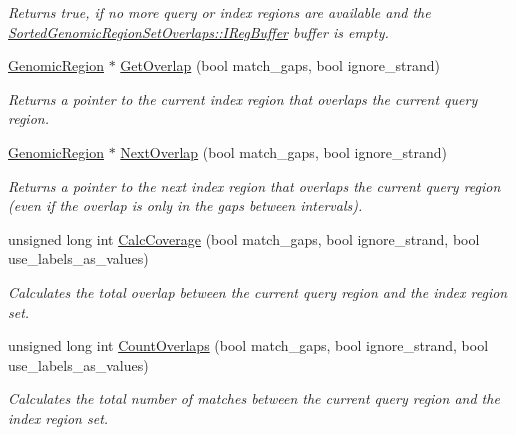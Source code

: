 \begin{CompactItemize}
\begin{CompactList}\small\item\em Returns true, if no more query or index regions are available and the \hyperlink{classSortedGenomicRegionSetOverlaps_19fa18e6abd9f045786698fff48a445f}{SortedGenomicRegionSetOverlaps::IRegBuffer} buffer is empty. \item\end{CompactList}\item 
\hyperlink{classGenomicRegion}{GenomicRegion} $\ast$ \hyperlink{classGenomicRegionSetOverlaps_46c3193d39eb61430b0267ca301b226e}{GetOverlap} (bool match\_\-gaps, bool ignore\_\-strand)
\begin{CompactList}\small\item\em Returns a pointer to the current index region that overlaps the current query region. \item\end{CompactList}\item 
\hyperlink{classGenomicRegion}{GenomicRegion} $\ast$ \hyperlink{classGenomicRegionSetOverlaps_2fa112eab38f07e7bc75ac76f5b9fc67}{NextOverlap} (bool match\_\-gaps, bool ignore\_\-strand)
\begin{CompactList}\small\item\em Returns a pointer to the next index region that overlaps the current query region (even if the overlap is only in the gaps between intervals). \item\end{CompactList}\item 
unsigned long int \hyperlink{classGenomicRegionSetOverlaps_309e9d296621aa80f1d13cdbd63d0aa4}{CalcCoverage} (bool match\_\-gaps, bool ignore\_\-strand, bool use\_\-labels\_\-as\_\-values)
\begin{CompactList}\small\item\em Calculates the total overlap between the current query region and the index region set. \item\end{CompactList}\item 
unsigned long int \hyperlink{classGenomicRegionSetOverlaps_4ce9e8020fe69a410818a1a6e6f0e69b}{CountOverlaps} (bool match\_\-gaps, bool ignore\_\-strand, bool use\_\-labels\_\-as\_\-values)
\begin{CompactList}\small\item\em Calculates the total number of matches between the current query region and the index region set. \item\end{CompactList}\end{CompactItemize}
